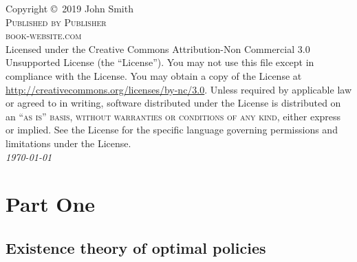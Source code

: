\documentclass[11pt,fleqn]{book} %
\begin{document}
    \noindent Copyright \copyright\ 2019 John Smith\\ %
    \noindent \textsc{Published by Publisher}\\ %
    \noindent \textsc{book-website.com}\\ %
    \noindent Licensed under the Creative Commons Attribution-Non Commercial 
    3.0  Unsupported License (the ``License''). You may not use this file 
    except in compliance with the License. You may obtain a copy of the License 
    at \url{http://creativecommons.org/licenses/by-nc/3.0}. Unless required by 
    applicable law or agreed to in writing, software distributed under the 
    License is distributed on an \textsc{``as is'' basis, without warranties or 
    conditions of any kind}, either express or implied. See the License for the 
    specific language governing permissions and limitations under the 
    License.\\
    \noindent 
    \textit{\today}
    \pagestyle{empty} %
    \tableofcontents %
    \cleardoublepage %
    \pagestyle{fancy} %
    \part{Part One}
    \chapter{Existence theory of optimal policies}
        
        
        
        
        
\end{document}
